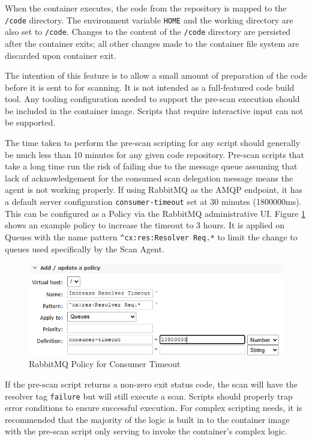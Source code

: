 When the container executes, the code from the repository is mapped to the \texttt{/code}
directory.  The environment variable \texttt{HOME} and the working directory are also set
to \texttt{/code}.  Changes to the content of the \texttt{/code} directory are persisted
after the container exits; all other changes made to the container file system are discarded
upon container exit.

The intention of this feature is to allow a small amount of preparation of the code
before it is sent to \cxone for scanning.  It is not intended as a full-featured code
build tool.  Any tooling configuration needed to support the pre-scan execution should be
included in the container image.  Scripts that require interactive input can not be supported.

The time taken to perform the pre-scan scripting for any script should generally be much
less than 10 minutes for any given code repository.  Pre-scan scripts that take a long time
run the risk of failing due to the message queue assuming that lack of acknowledgement
for the consumed scan delegation message means the agent is not working properly.  If
using RabbitMQ as the AMQP endpoint, it has a default server configuration \texttt{consumer-timeout}
set at 30 minutes (1800000ms).  This can be configured as a Policy via the RabbitMQ administrative
UI.  Figure \ref{fig:rmq-consumer-timeout} shows an example policy to increase the timeout to
3 hours.  It is applied on Queues with the name pattern \texttt{\^{}cx:res:Resolver Req.*} to limit
the change to queues used specifically by the Scan Agent.

\begin{figure}[h]
    \includegraphics[scale=1]{graphics/scan-agent-consumer-timeout.png}
    \centering
    \caption{RabbitMQ Policy for Consumer Timeout}
    \label{fig:rmq-consumer-timeout}
\end{figure}


If the pre-scan script returns a non-zero exit status code,  the scan will have the resolver tag
\texttt{failure} but will still execute a scan.  Scripts should properly trap error conditions
to ensure successful execution.  For complex scripting needs, it is recommended that
the majority of the logic is built in to the container image with the pre-scan script only
serving to invoke the container's complex logic.



